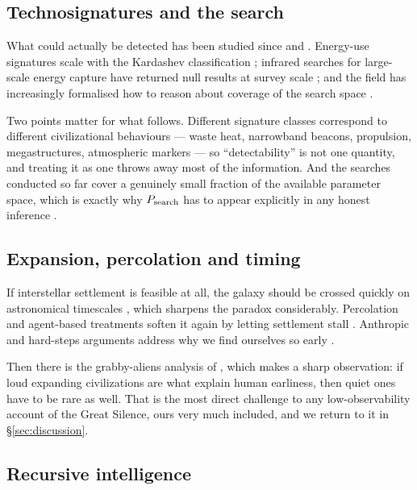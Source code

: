 \subsection{Technosignatures and the search}

What could actually be detected has been studied since \citet{cocconi1959} and
\citet{dyson1960}. Energy-use signatures scale with the Kardashev classification
\citep{kardashev1964}; infrared searches for large-scale energy capture have
returned null results at survey scale
\citep{wright2014ghat,griffith2015,garrett2015}; and the field has increasingly
formalised how to reason about coverage of the search space
\citep{tarter2001,wright2018state,sheikh2020,wright2022haystack}.

Two points matter for what follows. Different signature classes correspond to
different civilizational behaviours --- waste heat, narrowband beacons,
propulsion, megastructures, atmospheric markers --- so ``detectability'' is not
one quantity, and treating it as one throws away most of the information. And
the searches conducted so far cover a genuinely small fraction of the available
parameter space, which is exactly why $P_{\mathrm{search}}$ has to appear explicitly in any
honest inference \citep{wright2022haystack}. \Established

\subsection{Expansion, percolation and timing}

If interstellar settlement is feasible at all, the galaxy should be crossed
quickly on astronomical timescales \citep{hart1975,tipler1980,armstrong2013},
which sharpens the paradox considerably. Percolation and agent-based treatments
soften it again by letting settlement stall \citep{landis1998,forgan2009}.
Anthropic and hard-steps arguments address why we find ourselves so early
\citep{carter1983,watson2008,kipping2020}.

Then there is the grabby-aliens analysis of \citet{hanson2021grabby}, which
makes a sharp observation: if loud expanding civilizations are what explain
human earliness, then quiet ones have to be rare as well. That is the most
direct challenge to any low-observability account of the Great Silence, ours
very much included, and we return to it in \S\ref{sec:discussion}.

\subsection{Recursive intelligence}

